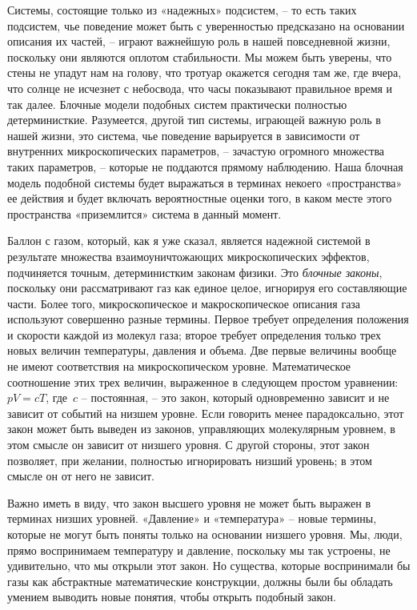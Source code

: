 \documentclass[../main.tex]{subfiles}
\begin{document}
Системы, состоящие только из «надежных» подсистем, \--- то есть таких подсистем, чье поведение может быть с уверенностью предсказано на основании описания их частей, \--- играют важнейшую роль в нашей повседневной жизни, поскольку они являются оплотом стабильности. Мы можем быть уверены, что стены не упадут нам на голову, что тротуар окажется сегодня там же, где вчера, что солнце не исчезнет с небосвода, что часы показывают правильное время и так далее. Блочные модели подобных систем практически полностью детерминисткие. Разумеется, другой тип системы, играющей важную роль в нашей жизни, это система, чье поведение варьируется в зависимости от внутренних микроскопических параметров, \--- зачастую огромного множества таких параметров, \--- которые не поддаются прямому наблюдению. Наша блочная модель подобной системы будет выражаться в терминах некоего «пространства» ее действия и будет включать вероятностные оценки того, в каком месте этого пространства «приземлится» система в данный момент.

Баллон с газом, который, как я уже сказал, является надежной системой в результате множества взаимоуничтожающих микроскопических эффектов, подчиняется точным, детерминистким законам физики. Это \emph{блочные законы}, поскольку они рассматривают газ как единое целое, игнорируя его составляющие части. Более того, микроскопическое и макроскопическое описания газа используют совершенно разные термины. Первое требует определения положения и скорости каждой из молекул газа; второе требует определения только трех новых величин температуры, давления и объема. Две первые величины вообще не имеют соответствия на микроскопическом уровне. Математическое соотношение этих трех величин, выраженное в следующем простом уравнении: $pV = cT$, где~$c$ \--- постоянная, \--- это закон, который одновременно зависит и не зависит от событий на низшем уровне. Если говорить менее парадоксально, этот закон может быть выведен из законов, управляющих молекулярным уровнем, в этом смысле он зависит от низшего уровня. С другой стороны, этот закон позволяет, при желании, полностью игнорировать низший уровень; в этом смысле он от него не зависит.

Важно иметь в виду, что закон высшего уровня не может быть выражен в терминах низших уровней. «Давление» и «температура» \--- новые термины, которые не могут быть поняты только на основании низшего уровня. Мы, люди, прямо воспринимаем температуру и давление, поскольку мы так устроены, не удивительно, что мы открыли этот закон. Но существа, которые воспринимали бы газы как абстрактные математические конструкции, должны были бы обладать умением выводить новые понятия, чтобы открыть подобный закон.
\end{document}
